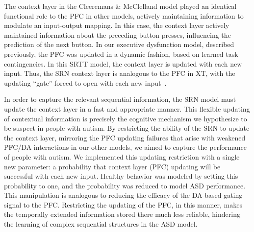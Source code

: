 The context layer in the Cleeremans \& McClelland model played an identical functional role to the PFC in other models, actively maintaining information to modulate an input-output mapping. In this case, the context layer actively maintained information about the preceding button presses, influencing the prediction of the next button. In our executive dysfunction model, described previously, the PFC was updated in a dynamic fashion, based on learned task contingencies. In this SRTT model, the context layer is updated with each new input. Thus, the SRN context layer is analogous to the PFC in XT, with the updating ``gate'' forced to open with each new input~\cite{OReillyRC:2000:Computational}.

In order to capture the relevant sequential information, the SRN model must update the context layer in a fast and appropriate manner. This flexible updating of contextual information is precisely the cognitive mechanism we hypothesize to be suspect in people with autism. By restricting the ability of the SRN to update the context layer, mirroring the PFC updating failures that arise with weakened PFC/DA interactions in our other models, we aimed to capture the performance of people with autism. We implemented this updating restriction with a single new parameter: a probability that context layer (PFC) updating will be successful with each new input. Healthy behavior was modeled by setting this probability to one, and the probability was reduced to model ASD performance. This manipulation is analogous to reducing the efficacy of the DA-based gating signal to the PFC.  Restricting the updating of the PFC, in this manner, makes the temporally extended information stored there much less reliable, hindering the learning of complex sequential structures in the ASD model.


